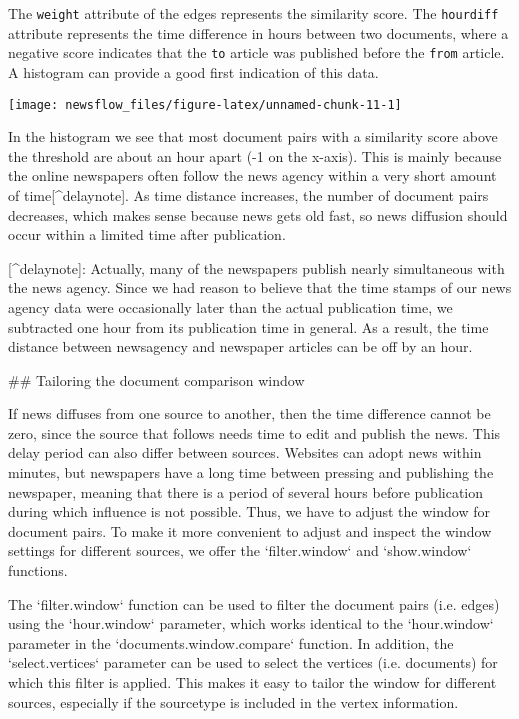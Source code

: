 The \texttt{weight} attribute of the edges represents the similarity
score. The \texttt{hourdiff} attribute represents the time difference in
hours between two documents, where a negative score indicates that the
\texttt{to} article was published before the \texttt{from} article. A
histogram can provide a good first indication of this data.

\begin{Schunk}

\texttt{[image: newsflow\_files/figure-latex/unnamed-chunk-11-1]} \end{Schunk}

In the histogram we see that most document pairs with a similarity score above the threshold are about an hour apart (-1 on the x-axis). 
This is mainly because the online newspapers often follow the news agency within a very short amount of time[^delaynote].
As time distance increases, the number of document pairs decreases, which makes sense because news gets old fast, so news diffusion should occur within a limited time after publication.

[^delaynote]: Actually, many of the newspapers publish nearly simultaneous with the news agency. Since we had reason to believe that the time stamps of our news agency data were occasionally later than the actual publication time, we subtracted one hour from its publication time in general. As a result, the time distance between newsagency and newspaper articles can be off by an hour. 

## Tailoring the document comparison window

If news diffuses from one source to another, then the time difference cannot be zero, since the source that follows needs time to edit and publish the news. 
This delay period can also differ between sources.
Websites can adopt news within minutes, but newspapers have a long time between pressing and publishing the newspaper, meaning that there is a period of several hours before publication during which influence is not possible.
Thus, we have to adjust the window for document pairs. 
To make it more convenient to adjust and inspect the window settings for different sources, we offer the `filter.window` and `show.window` functions.

The `filter.window` function can be used to filter the document pairs (i.e. edges) using the `hour.window` parameter, which works identical to the `hour.window` parameter in the `documents.window.compare` function. 
In addition, the `select.vertices` parameter can be used to select the vertices (i.e. documents) for which this filter is applied.
This makes it easy to tailor the window for different sources, especially if the sourcetype is included in the vertex information.

